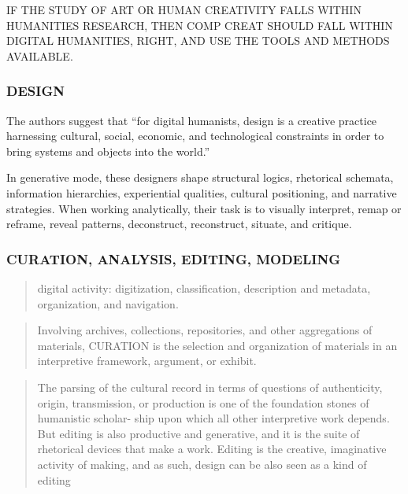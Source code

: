 \begin{draft}
  IF THE STUDY OF ART OR HUMAN CREATIVITY FALLS WITHIN HUMANITIES RESEARCH, THEN COMP CREAT SHOULD FALL WITHIN DIGITAL HUMANITIES, RIGHT, AND USE THE TOOLS AND METHODS AVAILABLE.\@
\end{draft}

\subsubsection*{DESIGN}
The authors suggest that ``for digital humanists, design is a creative practice harnessing cultural, social, economic, and technological constraints in order to bring systems and objects into the world.'' \citep[p.13]{Burdick2012}

In generative mode, these designers shape structural logics, rhetorical schemata, information hierarchies, experiential qualities, cultural positioning, and narrative strategies. When working analytically, their task is to visually interpret, remap or reframe, reveal patterns, deconstruct, reconstruct, situate, and critique. \citep[p.12]{Burdick2012}

\subsubsection*{CURATION, ANALYSIS, EDITING, MODELING}
\begin{quote}
  digital activity: digitization, classification, description and metadata, organization, and navigation. \citep[p.17]{Burdick2012}
\end{quote}

\begin{quote}
  Involving archives, collections, repositories, and other aggregations of materials, CURATION is the selection and organization of materials in an interpretive framework, argument, or exhibit. \citep[p.17]{Burdick2012}
\end{quote}

\begin{quote}
  The parsing of the cultural record in terms of questions of authenticity, origin, transmission, or production is one of the foundation stones of humanistic scholar- ship upon which all other interpretive work depends. But editing is also productive and generative, and it is the suite of rhetorical devices that make a work. Editing is the creative, imaginative activity of making, and as such, design can be also seen as a kind of editing \citep[p.18]{Burdick2012}
\end{quote}

